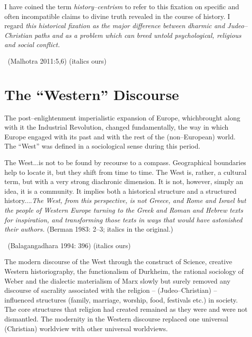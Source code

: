 \begin{myquote}
I have coined the term \textit{history–centrism} to refer to this fixation on specific and often incompatible claims to divine truth revealed in the course of history. I regard \textit{this historical fixation as the major difference between dharmic and Judeo–Christian paths and as a problem which can breed untold psychological, religious and social conflict.} 

~\hfill (Malhotra 2011:5,6) (italics ours)
\end{myquote}


\section*{The “Western” Discourse}

The post–enlightenment imperialistic expansion of Europe, which\break brought along with it the Industrial Revolution, changed fundamentally, the way in which Europe engaged with its past and with the rest of the (non–European) world. The “West” was defined in a sociological sense during this period.

\begin{myquote}
The West...is not to be found by recourse to a compass. Geographical boundaries help to locate it, but they shift from time to time. The West is, rather, a cultural term, but with a very strong diachronic dimension. It is not, however, simply an idea, it is a community. It implies both a historical structure and a structured history....\textit{The West, from this perspective, is not Greece, and Rome and Israel but the people of Western Europe turning to the Greek and Roman and Hebrew texts for inspiration, and transforming those texts in ways that would have astonished their authors.} (Berman 1983: 2–3; italics in the original.) 

~\hfill (Balagangadhara 1994: 396) (italics ours)
\end{myquote}

The modern discourse of the West through the construct of Science, creative Western historiography, the functionalism of Durkheim, the rational sociology of Weber and the dialectic materialism of Marx slowly but surely removed any discourse of sacrality associated with the religion – (Judeo–Christian) – influenced structures (family, marriage, worship, food, festivals etc.) in society. The core structures that religion had created remained as they were and were not dismantled. The modernity in the Western discourse replaced one universal (Christian) worldview with other universal worldviews.

